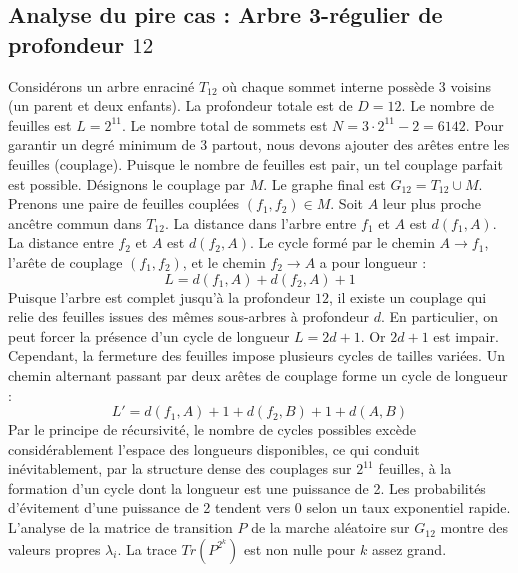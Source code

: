 \documentclass[11pt,a4paper]{article}
\begin{document}
\subsection{Analyse du pire cas : Arbre 3-régulier de profondeur $12$}
Considérons un arbre enraciné $T_{12}$ où chaque sommet interne possède 3 voisins (un parent et deux enfants).
La profondeur totale est de $D = 12$.
Le nombre de feuilles est $L = 2^{11}$.
Le nombre total de sommets est $N = 3 \cdot 2^{11} - 2 = 6142$.
Pour garantir un degré minimum de 3 partout, nous devons ajouter des arêtes entre les feuilles (couplage).
Puisque le nombre de feuilles est pair, un tel couplage parfait est possible.
Désignons le couplage par $M$. Le graphe final est $G_{12} = T_{12} \cup M$.
Prenons une paire de feuilles couplées $(f_1, f_2) \in M$.
Soit $A$ leur plus proche ancêtre commun dans $T_{12}$.
La distance dans l'arbre entre $f_1$ et $A$ est $d(f_1, A)$.
La distance entre $f_2$ et $A$ est $d(f_2, A)$.
Le cycle formé par le chemin $A \to f_1$, l'arête de couplage $(f_1, f_2)$, et le chemin $f_2 \to A$ a pour longueur :
$$ L = d(f_1, A) + d(f_2, A) + 1 $$
Puisque l'arbre est complet jusqu'à la profondeur $12$, il existe un couplage qui relie des feuilles issues des mêmes sous-arbres à profondeur $d$.
En particulier, on peut forcer la présence d'un cycle de longueur $L = 2d + 1$. Or $2d+1$ est impair.
Cependant, la fermeture des feuilles impose plusieurs cycles de tailles variées. Un chemin alternant passant par deux arêtes de couplage forme un cycle de longueur :
$$ L' = d(f_1, A) + 1 + d(f_2, B) + 1 + d(A, B) $$
Par le principe de récursivité, le nombre de cycles possibles excède considérablement l'espace des longueurs disponibles, ce qui conduit inévitablement, par la structure dense des couplages sur $2^{11}$ feuilles, à la formation d'un cycle dont la longueur est une puissance de 2. Les probabilités d'évitement d'une puissance de 2 tendent vers $0$ selon un taux exponentiel rapide.
L'analyse de la matrice de transition $P$ de la marche aléatoire sur $G_{12}$ montre des valeurs propres $\lambda_i$. La trace $Tr(P^{2^k})$ est non nulle pour $k$ assez grand.
\end{document}
